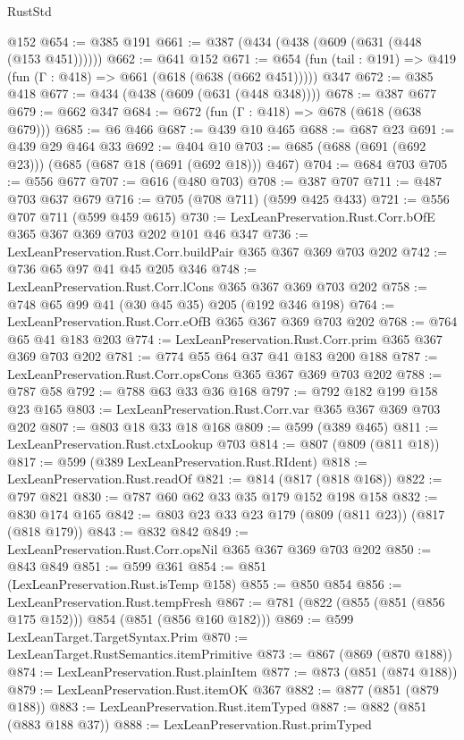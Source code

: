 \begin{lexlean}{RustStd}
\begin{coremodule}
    @152
@654 := @385 @191
@661 := @387 (@434 (@438 (@609 (@631 (@448 (@153 @451))))))
@662 := @641 @152
@671 := @654 (fun (tail : @191) => @419 (fun (Γ : @418) => @661 (@618 (@638 (@662 @451))))) @347
@672 := @385 @418
@677 := @434 (@438 (@609 (@631 (@448 @348))))
@678 := @387 @677
@679 := @662 @347
@684 := @672 (fun (Γ : @418) => @678 (@618 (@638 @679)))
@685 := @6 @466
@687 := @439 @10 @465
@688 := @687 @23
@691 := @439 @29 @464 @33
@692 := @404 @10
@703 := @685 (@688 (@691 (@692 @23))) (@685 (@687 @18 (@691 (@692 @18))) @467)
@704 := @684 @703
@705 := @556 @677
@707 := @616 (@480 @703)
@708 := @387 @707
@711 := @487 @703 @637 @679
@716 := @705 (@708 @711) (@599 @425 @433)
@721 := @556 @707 @711 (@599 @459 @615)
@730 := LexLeanPreservation.Rust.Corr.bOfE @365 @367 @369 @703 @202 @101 @46 @347
@736 := LexLeanPreservation.Rust.Corr.buildPair @365 @367 @369 @703 @202
@742 := @736 @65 @97 @41 @45 @205 @346
@748 := LexLeanPreservation.Rust.Corr.lCons @365 @367 @369 @703 @202
@758 := @748 @65 @99 @41 (@30 @45 @35) @205 (@192 @346 @198)
@764 := LexLeanPreservation.Rust.Corr.eOfB @365 @367 @369 @703 @202
@768 := @764 @65 @41 @183 @203
@774 := LexLeanPreservation.Rust.Corr.prim @365 @367 @369 @703 @202
@781 := @774 @55 @64 @37 @41 @183 @200 @188
@787 := LexLeanPreservation.Rust.Corr.opsCons @365 @367 @369 @703 @202
@788 := @787 @58
@792 := @788 @63 @33 @36 @168
@797 := @792 @182 @199 @158 @23 @165
@803 := LexLeanPreservation.Rust.Corr.var @365 @367 @369 @703 @202
@807 := @803 @18 @33 @18 @168
@809 := @599 (@389 @465)
@811 := LexLeanPreservation.Rust.ctxLookup @703
@814 := @807 (@809 (@811 @18))
@817 := @599 (@389 LexLeanPreservation.Rust.RIdent)
@818 := LexLeanPreservation.Rust.readOf
@821 := @814 (@817 (@818 @168))
@822 := @797 @821
@830 := @787 @60 @62 @33 @35 @179 @152 @198 @158
@832 := @830 @174 @165
@842 := @803 @23 @33 @23 @179 (@809 (@811 @23)) (@817 (@818 @179))
@843 := @832 @842
@849 := LexLeanPreservation.Rust.Corr.opsNil @365 @367 @369 @703 @202
@850 := @843 @849
@851 := @599 @361
@854 := @851 (LexLeanPreservation.Rust.isTemp @158)
@855 := @850 @854
@856 := LexLeanPreservation.Rust.tempFresh
@867 := @781 (@822 (@855 (@851 (@856 @175 @152))) @854 (@851 (@856 @160 @182)))
@869 := @599 LexLeanTarget.TargetSyntax.Prim
@870 := LexLeanTarget.RustSemantics.itemPrimitive
@873 := @867 (@869 (@870 @188))
@874 := LexLeanPreservation.Rust.plainItem
@877 := @873 (@851 (@874 @188))
@879 := LexLeanPreservation.Rust.itemOK @367
@882 := @877 (@851 (@879 @188))
@883 := LexLeanPreservation.Rust.itemTyped
@887 := @882 (@851 (@883 @188 @37))
@888 := LexLeanPreservation.Rust.primTyped

\end{coremodule}
\end{lexlean}
